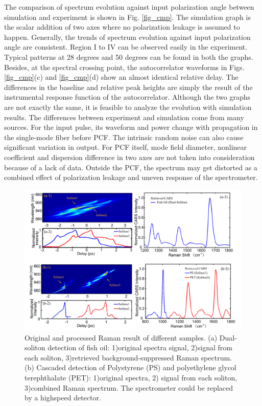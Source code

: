 \documentclass{osa-article}
\begin{document}
The comparison of spectrum evolution against input polarization angle between simulation and experiment is shown in Fig. \ref{fig_cmp}. The simulation graph is the scalar addition of two axes where no polarization leakage is assumed to happen. Generally, the trends of spectrum evolution against input polarization angle are consistent. Region I to IV can be observed easily in the experiment. Typical patterns at 28 degrees and 50 degrees can be found in both the graphs. Besides, at the spectral crossing point, the autocorrelator waveforms in Figs. \ref{fig_cmp}(c) and \ref{fig_cmp}(d) show an almost identical relative delay. The differences in the baseline and relative peak heights are simply the result of the instrumental response function of the autocorrelator. Although the two graphs are not exactly the same, it is feasible to analyze the evolution with simulation results. The differences between experiment and simulation come from many sources. For the input pulse, its waveform and power change with propagation in the single-mode fiber before PCF. The intrinsic random noise can also cause significant variation in output\cite{dudley_supercontinuum_2006}. For PCF itself, mode field diameter, nonlinear coefficient and dispersion difference in two axes are not taken into consideration because of a lack of data. Outside the PCF, the spectrum may get distorted as a combined effect of polarization leakage and uneven response of the spectrometer.


\begin{figure}[htbp]
    \centering%
    \includegraphics[width=\textwidth]{fig_cars.pdf}
    \caption{Original and processed Raman result of different samples. (a) Dual-soliton detection of fish oil: 1)original spectra signal, 2)signal from each soliton, 3)retrieved background-suppressed Raman spectrum. (b) Cascaded detection of Polystyrene (PS) and polyethylene glycol terephthalate (PET): 1)original spectra, 2) signal from each soliton, 3)combined Raman spectrum. The spectrometer could be replaced by a highspeed detector.}
    \label{fig_CARS}\vspace*{-6pt}
\end{figure}
\end{document}
